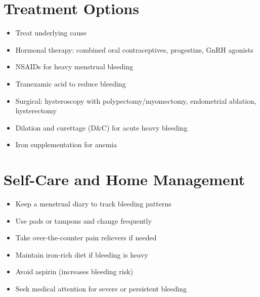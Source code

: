 \section*{Treatment Options}
\begin{itemize}
\item Treat underlying cause
\item Hormonal therapy: combined oral contraceptives, progestins, GnRH agonists
\item NSAIDs for heavy menstrual bleeding
\item Tranexamic acid to reduce bleeding
\item Surgical: hysteroscopy with polypectomy/myomectomy, endometrial ablation, hysterectomy
\item Dilation and curettage (D\&C) for acute heavy bleeding
\item Iron supplementation for anemia
\end{itemize}

\section*{Self-Care and Home Management}
\begin{itemize}
\item Keep a menstrual diary to track bleeding patterns
\item Use pads or tampons and change frequently
\item Take over-the-counter pain relievers if needed
\item Maintain iron-rich diet if bleeding is heavy
\item Avoid aspirin (increases bleeding risk)
\item Seek medical attention for severe or persistent bleeding
\end{itemize}

